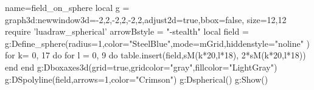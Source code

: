 \documentclass[10pt]{standalone}%
\begin{document}
\begin{luadraw}{name=field_on_sphere}
local g = graph3d:new{window3d={-2,2,-2,2,-2,2},adjust2d=true,bbox=false, size={12,12}}
require 'luadraw_spherical'
arrowBstyle = "-stealth"
local field = {}
g:Define_sphere({radius=1,color="SteelBlue",mode=mGrid,hiddenstyle="noline"} )
for k= 0, 17 do
    for l = 0, 9 do
        table.insert(field,{sM(k*20,l*18), 2*sM(k*20,l*18)})
    end
end
g:Dboxaxes3d({grid=true,gridcolor="gray",fillcolor="LightGray"})
g:DSpolyline(field,{arrows=1,color="Crimson"})
g:Dspherical()
g:Show()
\end{luadraw}
\end{document}
